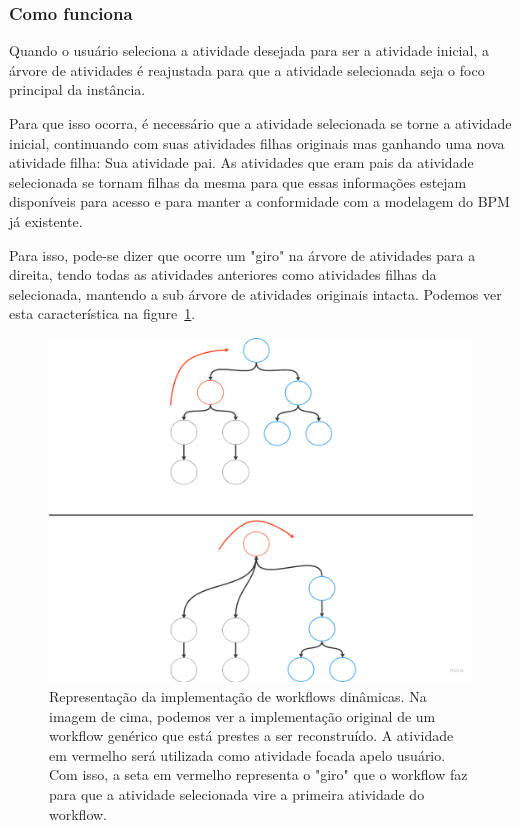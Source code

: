 \subsubsection{Como funciona}

Quando o usuário seleciona a atividade desejada para ser a atividade inicial, a árvore de atividades é reajustada para que a atividade selecionada seja o foco principal da instância.

Para que isso ocorra, é necessário que a atividade selecionada se torne a atividade inicial, continuando com suas atividades filhas originais mas ganhando uma nova atividade filha: Sua atividade pai. As atividades que eram pais da atividade selecionada se tornam filhas da mesma para que essas informações estejam disponíveis para acesso e para manter a conformidade com a modelagem do BPM já existente.

Para isso, pode-se dizer que ocorre um "giro" na árvore de atividades para a direita, tendo todas as atividades anteriores como atividades filhas da selecionada, mantendo a sub árvore de atividades originais intacta. Podemos ver esta característica na figure~\ref{fig:primeira_implementacao}.

\begin{figure}
    \centering
    \includegraphics[width=1\textwidth]{imgs/Implementacoes/primeiraImplementacao.png}
    \caption{Representação da implementação de workflows dinâmicas. Na imagem de cima, podemos ver a implementação original de um workflow genérico que está prestes a ser reconstruído. A atividade em vermelho será utilizada como atividade focada apelo usuário. Com isso, a seta em vermelho representa o "giro" que o workflow faz para que a atividade selecionada vire a primeira atividade do workflow.}
    \label{fig:primeira_implementacao}
\end{figure}


